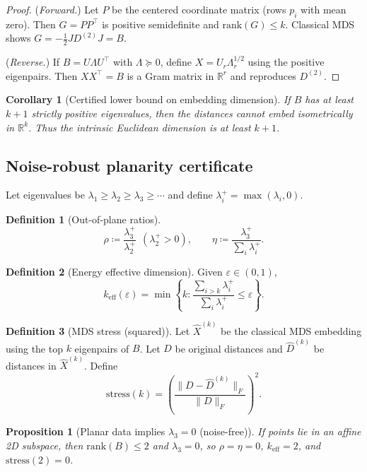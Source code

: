 \documentclass[11pt]{article}
\theoremstyle{definition}
\newtheorem{definition}{Definition}[section]
\theoremstyle{plain}
\newtheorem{proposition}{Proposition}[section]
\newtheorem{corollary}{Corollary}[section]
\theoremstyle{remark}
\begin{document}
\begin{proof}
(\emph{Forward.}) Let $P$ be the centered coordinate matrix (rows $p_i$ with mean zero). Then $G=PP^\top$ is positive semidefinite and $\mathrm{rank}(G)\le k$.
Classical MDS shows $G=-\frac12 JD^{(2)}J=B$.

(\emph{Reverse.}) If $B=U\Lambda U^\top$ with $\Lambda\succeq 0$, define $X=U_r\Lambda_r^{1/2}$ using the positive eigenpairs.
Then $XX^\top=B$ is a Gram matrix in $\mathbb{R}^r$ and reproduces $D^{(2)}$.
\end{proof}

\begin{corollary}[Certified lower bound on embedding dimension]\label{cor:C}
If $B$ has at least $k+1$ strictly positive eigenvalues, then the distances cannot embed isometrically in $\mathbb{R}^k$.
Thus the intrinsic Euclidean dimension is at least $k+1$.
\end{corollary}

\subsection{Noise-robust planarity certificate}
Let eigenvalues be $\lambda_1\ge\lambda_2\ge\lambda_3\ge\cdots$ and define $\lambda_i^+=\max(\lambda_i,0)$.

\begin{definition}[Out-of-plane ratios]
\[
  \rho \coloneqq \frac{\lambda_3^+}{\lambda_2^+}\ \ (\lambda_2^+>0),\qquad
  \eta \coloneqq \frac{\lambda_3^+}{\sum_i \lambda_i^+}.
\]
\end{definition}

\begin{definition}[Energy effective dimension]
Given $\varepsilon\in(0,1)$,
\[
  k_{\mathrm{eff}}(\varepsilon)=\min\left\{k:\frac{\sum_{i>k}\lambda_i^+}{\sum_i \lambda_i^+}\le\varepsilon\right\}.
\]
\end{definition}

\begin{definition}[MDS stress (squared)]
Let $\hat X^{(k)}$ be the classical MDS embedding using the top $k$ eigenpairs of $B$.
Let $D$ be original distances and $\hat D^{(k)}$ be distances in $\hat X^{(k)}$.
Define
\[
  \mathrm{stress}(k)=\left(\frac{\|D-\hat D^{(k)}\|_F}{\|D\|_F}\right)^2.
\]
\end{definition}

\begin{proposition}[Planar data implies $\lambda_3=0$ (noise-free)]\label{prop:planar}
If points lie in an affine 2D subspace, then $\mathrm{rank}(B)\le 2$ and $\lambda_3=0$, so $\rho=\eta=0$, $k_{\mathrm{eff}}=2$, and $\mathrm{stress}(2)=0$.
\end{proposition}
\end{document}
